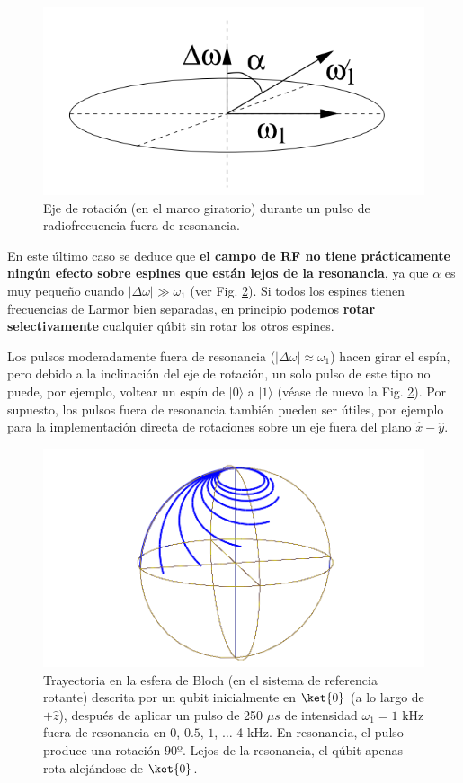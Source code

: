 \documentclass[a4paper,11pt]{book} %
\numberwithin{equation}{chapter}
\begin{document}
\begin{itemize}
\begin{itemize}
	\begin{figure}[H]
	\centering 
	\includegraphics[width=0.35\linewidth]{Figuras/Fig_Harware_NMR_nutacion_inclinada}
	\caption{Eje de rotación (en el marco giratorio) durante un pulso de radiofrecuencia fuera de resonancia.}
	\label{Fig_Harware_NMR_nutacion_inclinada}
	\end{figure}
	
	\end{itemize}		

\end{itemize}

En este último caso se deduce que \textbf{el campo de RF no tiene prácticamente ningún efecto sobre espines que están lejos de la resonancia}, ya que $\alpha$ es muy pequeño cuando $|\Delta \omega | \gg \omega_1$ (ver Fig. \ref{Fig_Harware_NMR_espiral_bloch_2}). Si todos los espines tienen frecuencias de Larmor bien separadas, en principio podemos \textbf{rotar selectivamente} cualquier qúbit sin rotar los otros espines.



Los pulsos moderadamente fuera de resonancia ($|\Delta \omega| \approx \omega_1$) hacen girar el espín, pero debido a la inclinación del eje de rotación, un solo pulso de este tipo no puede, por ejemplo, voltear un espín de $|0 \rangle$ a $|1 \rangle$ (véase de nuevo la Fig. \ref{Fig_Harware_NMR_espiral_bloch_2}). Por supuesto, los pulsos fuera de resonancia también pueden ser útiles, por ejemplo para la implementación directa de rotaciones sobre un eje fuera del plano $\hat{x} - \hat{y}$.

	\begin{figure}[H]
	\centering 
	\includegraphics[width=0.4\linewidth]{Figuras/Fig_Harware_NMR_espiral_bloch_2.png}
	\caption{Trayectoria en la esfera de Bloch (en el sistema de referencia rotante) descrita por un qubit inicialmente en $\ket{0}$ (a lo largo de $+\hat{z}$), después de aplicar un pulso de 250 $\mu s$ de intensidad $\omega_1 = 1$ kHz fuera de resonancia en $0$, $0.5$, $1$, $\dots$ 4 kHz. En resonancia, el pulso produce una rotación $90º$. Lejos de la resonancia, el qúbit apenas rota alejándose de $\ket{0}$.}
	\label{Fig_Harware_NMR_espiral_bloch_2}
	\end{figure}
\end{document}
